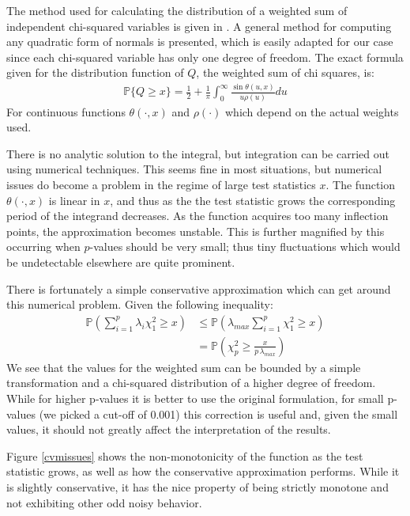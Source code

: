 The method used for calculating the distribution of a weighted sum of independent chi-squared variables is given in \cite{imhof1961}.
A general method for computing any quadratic form of normals is presented, which is easily adapted for our case since
each chi-squared variable has only one degree of freedom. The exact formula given for the distribution function of $Q$, the weighted
sum of chi squares, is:
\begin{align*}
\mathbb{P}\{Q \geq x \} = \frac{1}{2} + \frac{1}{\pi} \int_{0}^{\infty} \frac{\sin\theta(u,x)}{u \rho(u) } du
\end{align*}
For continuous functions $\theta(\cdot, x)$ and $\rho(\cdot)$ which depend on the actual weights used. 

There is no analytic solution to the integral, but integration can be carried out using numerical techniques. This seems
fine in most situations, but numerical issues do become a problem in the regime of large test statistics $x$. The function
$\theta(\cdot, x)$ is linear in $x$, and thus as the the test statistic grows the corresponding period of the integrand 
decreases. As the function acquires too many inflection points, the approximation becomes unstable. This is further
magnified by this occurring when $p$-values should be very small; thus tiny fluctuations which would be undetectable
elsewhere are quite prominent. 

There is fortunately a simple conservative approximation which can get around this numerical problem. Given the
following inequality:
\begin{align*}
\mathbb{P} \left(\sum_{i=1}^{p} \lambda_i \chi^2_1 \geq x \right) &\leq \mathbb{P} \left( \lambda_{max} \sum_{i=1}^{p} \chi^2_1 \geq x \right) \\
&= \mathbb{P} \left(\chi^2_p \geq \frac{x}{p \, \lambda_{max}} \right)
\end{align*}
We see that the values for the weighted sum can be bounded by a simple transformation and a chi-squared distribution
of a higher degree of freedom. While for higher p-values it is better to use the original formulation, for small
p-values (we picked a cut-off of 0.001) this correction is useful and, given the small values, it should not
greatly affect the interpretation of the results.

Figure \ref{cvmissues} shows the non-monotonicity of the function as the test statistic grows, as well as how the
conservative approximation performs. While it is slightly conservative, it has the nice property of being strictly
monotone and not exhibiting other odd noisy behavior.

